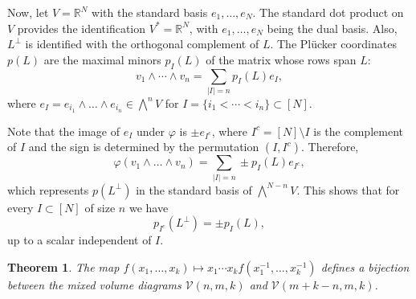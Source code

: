\documentclass[11pt]{amsart}
\newcommand{\R}{\mathbb R}
\newcommand{\cV}{\mathcal V}
\newtheorem{thm}{Theorem}[section]
\theoremstyle{definition}
\theoremstyle{remark}
\begin{document}
 Now, let $V=\R^N$ with the standard basis $e_1,\dots, e_N$. The standard dot product on $V$ provides the identification $V^*=\R^N$, with $e_1,\dots, e_N$ being the dual basis. Also, $L^\perp$ is identified with the orthogonal complement of $L$. The Plücker coordinates $p(L)$ are the maximal minors $p_I(L)$ of the matrix whose rows span $L$:
$$
v_1\wedge\cdots\wedge v_n=\sum_{|I|=n} p_I(L) e_I,
$$
where $e_I=e_{i_1}\wedge\dots\wedge e_{i_n}\in\bigwedge^n V$
for $I=\{i_1<\cdots<i_n\}\subset[N]$. 

Note that the image of $e_I$ under $\varphi$ is $\pm e_{I^c}$, where $I^c=[N]\setminus I$ is the complement of $I$ and the sign is determined by the permutation $(I,I^c)$. Therefore,
$$
\varphi(v_1\wedge\dots\wedge v_n)=\sum_{|I|=n} \pm p_I(L) e_{I^c},
$$
which represents $p(L^\perp)$ in the standard basis of $\bigwedge^{N-n} V$.
This shows that for every $I\subset[N]$ of size $n$ we have
\begin{equation}\label{e:Grass-dual}
p_{I^c}(L^\perp)=\pm p_I(L),   
\end{equation}
up to a scalar independent of $I$.

\begin{thm}
The map $f(x_1,\dots, x_k)\mapsto x_1\cdots x_k f(x_1^{-1},\dots, x_k^{-1})$ defines a bijection between the
mixed volume diagrams $\cV(n,m,k)$ and $\cV(m+k-n,m,k)$.
\end{thm}
\end{document}
